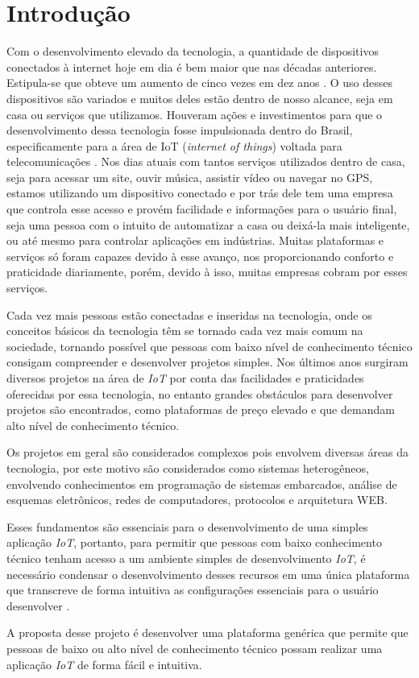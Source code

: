 \documentclass[../../layout.tex]{subfiles}
\begin{document}
\chapter{Introdução}
Com o desenvolvimento elevado da tecnologia, a quantidade de dispositivos conectados à internet hoje em dia é bem maior que nas décadas anteriores. Estipula-se que obteve um aumento de cinco vezes em dez anos \cite{conectdevicesnum}. O uso desses dispositivos são variados e muitos deles estão dentro de nosso alcance, seja em casa ou serviços que utilizamos. Houveram ações e investimentos para que o desenvolvimento dessa tecnologia fosse impulsionada dentro do Brasil, especificamente para a área de IoT (\emph{internet of things}) voltada para telecomunicações \cite{iotinvest}. Nos dias atuais com tantos serviços utilizados dentro de casa, seja para acessar um site, ouvir música, assistir vídeo ou navegar no GPS, estamos utilizando um dispositivo conectado e por trás dele tem uma empresa que controla esse acesso e provém facilidade e informações para o usuário final, seja uma pessoa com o intuito de automatizar a casa ou deixá-la mais inteligente, ou até mesmo para controlar aplicações em indústrias. Muitas plataformas e serviços só foram capazes devido à esse avanço, nos proporcionando conforto e praticidade diariamente, porém, devido à isso, muitas empresas cobram por esses serviços.\par
Cada vez mais pessoas estão conectadas e inseridas na tecnologia, onde os conceitos básicos da tecnologia têm se tornado cada vez mais comum na sociedade, tornando possível  que pessoas com baixo nível de conhecimento técnico consigam compreender e desenvolver projetos simples. Nos últimos anos surgiram diversos projetos na área de \emph{IoT} por conta das facilidades e praticidades oferecidas por essa tecnologia, no entanto grandes obstáculos para desenvolver projetos são encontrados, como plataformas de preço elevado e que demandam alto nível de conhecimento técnico.\par
Os projetos em geral são considerados complexos pois envolvem diversas áreas da tecnologia, por este motivo são considerados como sistemas heterogêneos, envolvendo conhecimentos em programação de sistemas embarcados, análise de esquemas eletrônicos, redes de computadores, protocolos e arquitetura WEB.\par
Esses fundamentos são essenciais para o desenvolvimento de uma simples aplicação \emph{IoT}, portanto, para permitir que pessoas com baixo conhecimento técnico tenham acesso a um ambiente simples de desenvolvimento \emph{IoT}, é necessário condensar o desenvolvimento desses recursos em uma única plataforma que transcreve de forma intuitiva as configurações essenciais para o usuário desenvolver \cite{IoTeveryone}.\par
A proposta desse projeto é desenvolver uma plataforma genérica que permite que pessoas de baixo ou alto nível de conhecimento técnico possam realizar uma aplicação \emph{IoT} de forma fácil e intuitiva.
\end{document}

